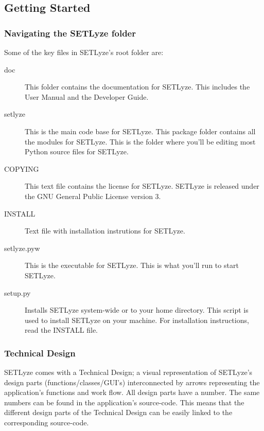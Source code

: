 \documentclass[letterpaper,10pt,english]{sphinxmanual}
\begin{document}
\subsection{Getting Started}
\label{developer_guide:getting-started}

\subsubsection{Navigating the SETLyze folder}
\label{developer_guide:navigating-the-setlyze-folder}
Some of the key files in SETLyze's root folder are:
\begin{description}
\item[{doc}] \leavevmode
This folder contains the documentation for SETLyze. This includes
the User Manual and the Developer Guide.

\item[{setlyze}] \leavevmode
This is the main code base for SETLyze. This package folder contains
all the modules for SETLyze. This is the folder where you'll be
editing most Python source files for SETLyze.

\item[{COPYING}] \leavevmode
This text file contains the license for SETLyze. SETLyze is released
under the GNU General Public License version 3.

\item[{INSTALL}] \leavevmode
Text file with installation instrutions for SETLyze.

\item[{setlyze.pyw}] \leavevmode
This is the executable for SETLyze. This is what you'll run to start
SETLyze.

\item[{setup.py}] \leavevmode
Installs SETLyze system-wide or to your home directory. This script
is used to install SETLyze on your machine. For installation
instructions, read the INSTALL file.

\end{description}


\subsubsection{Technical Design}
\label{developer_guide:technical-design}
SETLyze comes with a Technical Design; a visual representation of
SETLyze's design parts (functions/classes/GUI's) interconnected by arrows
representing the application's functions and work flow. All design parts
have a number. The same numbers can be found in the application's
source-code. This means that the different design parts of the Technical
Design can be easily linked to the corresponding source-code.
\end{document}

